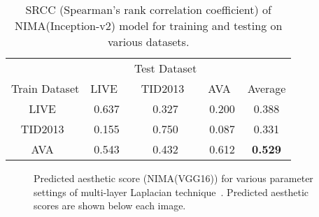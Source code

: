 \documentclass[10pt,twocolumn,twoside]{IEEEtran}
\begin{document}
\begin{table}[!t]
\begin{center}
\captionsetup{width=0.48\textwidth}
\caption{SRCC (Spearman's rank correlation coefficient) of NIMA(Inception-v2) model for training and testing on various datasets.}
\begin{tabular}{c|cccc}    \toprule
 & & Test Dataset & \\ \cline{2-4}
Train Dataset  & LIVE~\cite{ghadiyaram2016massive} & TID2013~\cite{ponomarenko2013color} & AVA~\cite{murray2012ava} & Average \\\midrule
LIVE~\cite{ghadiyaram2016massive} & 0.637 & 0.327 &   0.200 & 0.388\\ 
TID2013~\cite{ponomarenko2013color} & 0.155 & 0.750 &   0.087 &  0.331\\
AVA~\cite{murray2012ava} & 0.543 & 0.432 & 0.612 & \textbf{0.529}\\\bottomrule
 \hline
\end{tabular}
\label{tab:cross_validation_srcc}
\end{center}
\end{table}

\begin{figure*}[!t]
\vspace{12 mm}
\begin{center}
\end{center}
\vspace{-0 mm}
{\caption{Predicted aesthetic score (NIMA(VGG16)) for various parameter settings of multi-layer Laplacian technique~\cite{talebi2016fast}. Predicted aesthetic scores are shown below each image. \label{fig:ltm_results2}}}
\vspace{12 mm}
\end{figure*}
\end{document}

